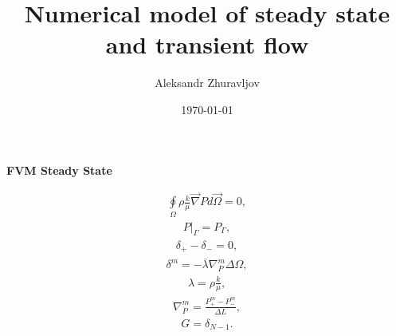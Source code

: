 \documentclass[a4paper,12pt]{extreport}
\author{Aleksandr Zhuravljov}
\title{Numerical model of steady state and transient flow}
\date{\today}
\begin{document}
\pagecolor{pageColor}
\color{fontColor}

\begin{multicols}{2}
\begin{center}
{\large \textbf{FVM Steady State}}
\end{center}
%
\begin{eqnarray}
\label{eq:poisson_integral}
\oint \limits_{\Omega} \rho \frac{k}{\mu} \vec{\nabla}P d\vec{\Omega} = 0,
\end{eqnarray}
%
\begin{eqnarray}
\label{eq:poisson_integral_bound}
P \Big|_\Gamma = P_\Gamma,
\end{eqnarray}
%
\begin{eqnarray}
\label{eq:poisson_integral_num}
\delta_{+} - \delta_{-} = 0,
\end{eqnarray}
%
\begin{eqnarray}
\label{eq:delta}
\delta^{m} = -\overline{\lambda} \nabla^{m}_{P}\Delta \Omega,
\end{eqnarray}
%
\begin{eqnarray}
\label{eq:lambda}
\lambda = \rho \frac{k}{\mu},
\end{eqnarray}
%
\begin{eqnarray}
\label{eq:nabla_P_num}
\nabla^{m}_{P} = \frac{P^{m}_{+} - P^{m}_{-}}{\Delta L},
\end{eqnarray}
%
\begin{eqnarray}
\label{eq:Consumption_poisson_integral}
G = \delta_{N-1}.
\end{eqnarray}


\end{multicols}
\end{document}
